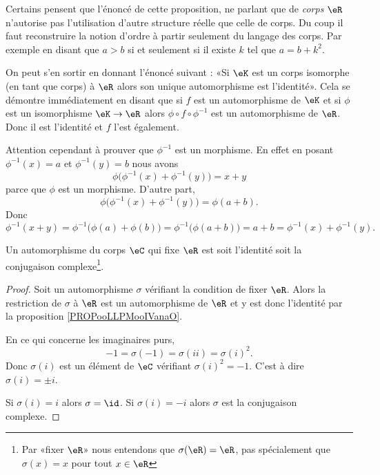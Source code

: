 \begin{remark}      \label{REMooGHEDooOYYUPk}
    Certains\cite{ooEKUSooDDDWuT} pensent que l'énoncé de cette proposition, ne parlant que de \emph{corps} \( \eR\) n'autorise pas l'utilisation d'autre structure réelle que celle de corps. Du coup il faut reconstruire la notion d'ordre à partir seulement du langage des corps. Par exemple en disant que \( a>b\) si et seulement si il existe \( k\) tel que \( a=b+k^2\).

    On peut s'en sortir en donnant l'énoncé suivant : «Si \( \eK\) est un corps isomorphe (en tant que corps) à \( \eR\) alors son unique automorphisme est l'identité». Cela se démontre immédiatement en disant que si \( f\) est un automorphisme de \( \eK\) et si \( \phi\) est un isomorphisme \( \eK\to \eR\) alors \( \phi\circ f\circ \phi^{-1}\) est un automorphisme de \( \eR\). Donc il est l'identité et \( f\) l'est également.

    Attention cependant à prouver que \( \phi^{-1}\) est un morphisme. En effet en posant \( \phi^{-1}(x)=a\) et \( \phi^{-1}(y)=b\) nous avons
    \begin{equation}
        \phi\big( \phi^{-1}(x)+\phi^{-1}(y) \big)=x+y
    \end{equation}
    parce que \( \phi\) est un morphisme. D'autre part,
    \begin{equation}
        \phi\big( \phi^{-1}(x)+\phi^{-1}(y) \big)=\phi(a+b).
    \end{equation}
    Donc
    \begin{equation}
        \phi^{-1}(x+y)=\phi^{-1}\big( \phi(a)+\phi(b) \big)=\phi^{-1}\big( \phi(a+b) \big)=a+b=\phi^{-1}(x)+\phi^{-1}(y).
    \end{equation}
\end{remark}

\begin{proposition}     \label{PROPooEATMooIPPrRV}
    Un automorphisme du corps \( \eC\) qui fixe \( \eR\) est soit l'identité soit la conjugaison complexe\footnote{Par «fixer \( \eR\)» nous entendons que \( \sigma(\eR)=\eR\), pas spécialement que \( \sigma(x)=x\) pour tout \( x\in \eR\)}.
\end{proposition}

\begin{proof}
    Soit un automorphisme \( \sigma\) vérifiant la condition de fixer \( \eR\). Alors la restriction de \( \sigma\) à \( \eR\) est un automorphisme de \( \eR\) et y est donc l'identité par la proposition \ref{PROPooLLPMooIVanaO}.

    En ce qui concerne les imaginaires purs,
    \begin{equation}
        -1=\sigma(-1)=\sigma(ii)=\sigma(i)^2.
    \end{equation}
    Donc \( \sigma(i)\) est un élément de \( \eC\) vérifiant \( \sigma(i)^2=-1\). C'est à dire \( \sigma(i)=\pm i\).

    Si \( \sigma(i)=i\) alors \( \sigma=\id\). Si \( \sigma(i)=-i\) alors \( \sigma\) est la conjugaison complexe.
\end{proof}

